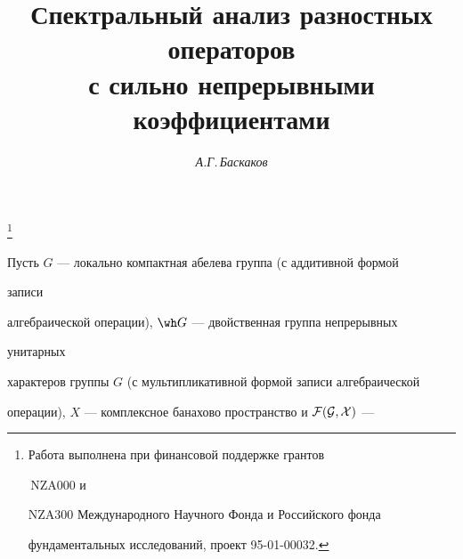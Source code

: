 









\author{\it А.Г.\,Баскаков} 


\title{Спектральный анализ разностных операторов\\ 


с сильно непрерывными коэффициентами}


 


\thanks{Работа выполнена при финансовой поддержке грантов


\No\,NZA000 и 


NZA300 Международного Научного Фонда и Российского фонда 


фундаментальных исследований, проект 95-01-00032.} 


\date{} 




 


\pagestyle{plain} %


 


 




 


\maketitle 


 




 


Пусть $G$ --- локально компактная абелева группа (с аддитивной формой 


записи 


алгебраической операции), $\wh G$ --- двойственная группа непрерывных 


унитарных 


характеров группы $G$ (с мультипликативной формой записи алгебраической 


операции), $X$ --- комплексное банахово пространство и $\cal F(G,X)$ --- 


